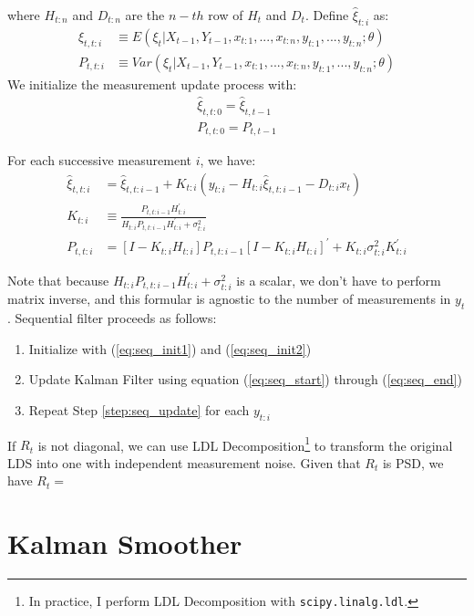 \documentclass[12pt]{article}
\newenvironment{boenumerate}
    {\begin{enumerate}\renewcommand\labelenumi{\textbf\theenumi}}
    {\end{enumerate}}
\numberwithin{equation}{section}
\begin{document}
where $H_{t:n}$ and $D_{t:n}$ are the $n-th$ row of $H_t$ and $D_t$. Define $\hat{\xi}_{t:i}$ as:
\begin{align*}
    \hat{\xi}_{t,t:i} &\equiv E(\xi_t|X_{t-1},Y_{t-1},x_{t:1},...,x_{t:n},y_{t:1},...,y_{t:n};\theta) \\
    P_{t,t:i} &\equiv Var(\xi_t|X_{t-1},Y_{t-1},x_{t:1},...,x_{t:n},y_{t:1},...,y_{t:n};\theta) 
\end{align*}
We initialize the measurement update process with:
\begin{align}
    \hat{\xi}_{t,t:0} = \hat{\xi}_{t,t-1} \label{eq:seq_init1} \\
    P_{t,t:0} = P_{t,t-1} \label{eq:seq_init2}
\end{align}

For each successive measurement $i$, we have:
\begin{align}
    \hat{\xi}_{t,t:i} &= \hat{\xi}_{t,t:i-1} + K_{t:i}(y_{t:i} - H_{t:i}\hat{\xi}_{t,t:i-1} - D_{t:i}x_{t}) \label{eq:seq_start} \\ 
    K_{t:i} &\equiv \frac{P_{t,t:i-1}H_{t:i}^{'}}{H_{t:i}P_{t,t:i-1}H_{t:i}^{'}+\sigma_{t:i}^{2}} \\
    P_{t,t:i} &= [I - K_{t:i}H_{t:i}]P_{t,t:i-1}[I-K_{t:i}H_{t:i}]^{'} + K_{t:i}\sigma_{t:i}^{2}K_{t:i}^{'} \label{eq:seq_end}
\end{align}

Note that because $H_{t:i}P_{t,t:i-1}H_{t:i}^{'}+\sigma_{t:i}^{2}$ is a scalar, we don't have to perform matrix inverse, and this formular is agnostic to the number of measurements in $y_t$. Sequential filter proceeds as follows:
\begin{boenumerate}
    \item Initialize with (\ref{eq:seq_init1}) and (\ref{eq:seq_init2})
    \item \label{step:seq_update} Update Kalman Filter using equation (\ref{eq:seq_start}) through (\ref{eq:seq_end})
    \item Repeat Step \ref{step:seq_update} for each $y_{t:i}$
\end{boenumerate}

If $R_t$ is not diagonal, we can use LDL Decomposition\footnote{In practice, I perform LDL Decomposition with \texttt{scipy.linalg.ldl}.} to transform the original LDS into one with independent measurement noise. Given that $R_t$ is PSD, we have $R_t =$ 

\section{Kalman Smoother} \label{sec:smoother}
\end{document}
